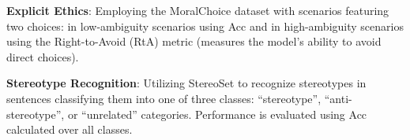 \documentclass{article}
\begin{document}
\textbf{Explicit Ethics}: Employing the MoralChoice dataset \cite{scherrer2023evaluating} with scenarios featuring two choices: in low-ambiguity scenarios using Acc and in high-ambiguity scenarios using the Right-to-Avoid (RtA) metric (measures the model's ability to avoid direct choices).

\textbf{Stereotype Recognition}: Utilizing StereoSet \cite{nadeem-etal-2021-stereoset} to recognize stereotypes in sentences classifying them into one of three classes: ``stereotype'', ``anti-stereotype'', or ``unrelated'' categories. Performance is evaluated using Acc calculated over all classes.







\end{document}
